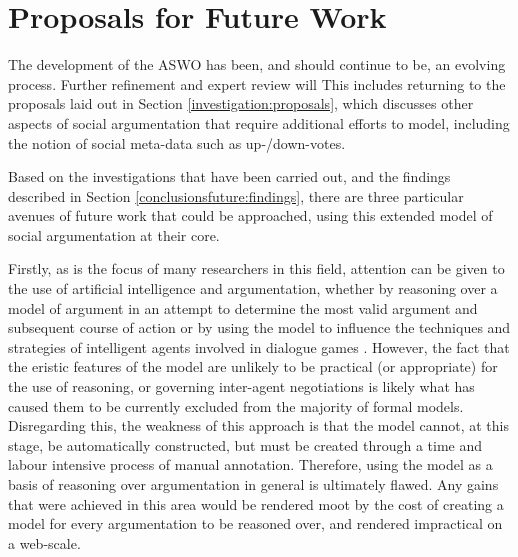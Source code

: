 




\section{Proposals for Future Work}
The development of the ASWO has been, and should continue to be, an evolving process. Further refinement and expert review will
This includes returning to the proposals laid out in Section \ref{investigation:proposals}, which discusses other aspects of social argumentation that require additional efforts to model, including the notion of social meta-data such as up-/down-votes.






Based on the investigations that have been carried out, and the findings described in Section \ref{conclusionsfuture:findings}, there are three particular avenues of future work that could be approached, using this extended model of social argumentation at their core.

Firstly, as is the focus of many researchers in this field, attention can be given to the use of artificial intelligence and argumentation, whether by reasoning over a model of argument in an attempt to determine the most valid argument and subsequent course of action \citep{caminada2007} or by using the model to influence the techniques and strategies of intelligent agents involved in dialogue games \citep{Reed2008}. However, the fact that the eristic features of the model are unlikely to be practical (or appropriate) for the use of reasoning, or governing inter-agent negotiations is likely what has caused them to be currently excluded from the majority of formal models. Disregarding this, the weakness of this approach is that the model cannot, at this stage, be automatically constructed, but must be created through a time and labour intensive process of manual annotation. Therefore, using the model as a basis of reasoning over argumentation in general is ultimately flawed. Any gains that were achieved in this area would be rendered moot by the cost of creating a model for every argumentation to be reasoned over, and rendered impractical on a web-scale.

